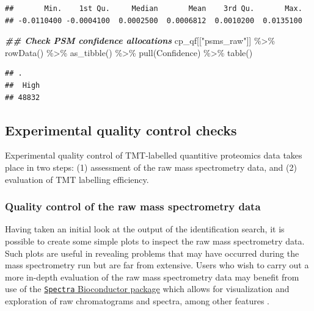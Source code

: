 \documentclass[9pt,a4paper,]{extarticle}
\newenvironment{Shaded}{\begin{snugshade}}{\end{snugshade}}
\newcommand{\DocumentationTok}[1]{\textcolor[rgb]{0.56,0.35,0.01}{\textbf{\textit{#1}}}}
\newcommand{\FunctionTok}[1]{\textcolor[rgb]{0.00,0.00,0.00}{#1}}
\newcommand{\NormalTok}[1]{#1}
\newcommand{\SpecialCharTok}[1]{\textcolor[rgb]{0.00,0.00,0.00}{#1}}
\newcommand{\StringTok}[1]{\textcolor[rgb]{0.31,0.60,0.02}{#1}}
\begin{document}
\begin{verbatim}
##       Min.    1st Qu.     Median       Mean    3rd Qu.       Max. 
## -0.0110400 -0.0004100  0.0002500  0.0006812  0.0010200  0.0135100
\end{verbatim}

\begin{Shaded}
\begin{Highlighting}[]
\DocumentationTok{\#\# Check PSM confidence allocations}
\NormalTok{cp\_qf[[}\StringTok{"psms\_raw"}\NormalTok{]] }\SpecialCharTok{\%\textgreater{}\%} 
  \FunctionTok{rowData}\NormalTok{() }\SpecialCharTok{\%\textgreater{}\%} 
  \FunctionTok{as\_tibble}\NormalTok{() }\SpecialCharTok{\%\textgreater{}\%} 
  \FunctionTok{pull}\NormalTok{(Confidence) }\SpecialCharTok{\%\textgreater{}\%} 
  \FunctionTok{table}\NormalTok{()}
\end{Highlighting}
\end{Shaded}

\begin{verbatim}
## .
##  High 
## 48832
\end{verbatim}

\hypertarget{experimental-quality-control-checks}{%
\subsection{Experimental quality control checks}\label{experimental-quality-control-checks}}

Experimental quality control of TMT-labelled quantitive proteomics data takes
place in two steps: (1) assessment of the raw mass spectrometry data, and (2)
evaluation of TMT labelling efficiency.

\hypertarget{quality-control-of-the-raw-mass-spectrometry-data}{%
\subsubsection{Quality control of the raw mass spectrometry data}\label{quality-control-of-the-raw-mass-spectrometry-data}}

Having taken an initial look at the output of the identification search, it is
possible to create some simple plots to inspect the raw mass spectrometry data.
Such plots are useful in revealing problems that may have occurred during
the mass spectrometry run but are far from extensive. Users who wish to carry
out a more in-depth evaluation of the raw mass spectrometry data may benefit
from use of the
\href{https://bioconductor.org/packages/release/bioc/html/Spectra.html}{\texttt{Spectra} Bioconductor package}
which allows for visualization and exploration of raw chromatograms and spectra,
among other features \citep{Rainer2022}.
\end{document}
